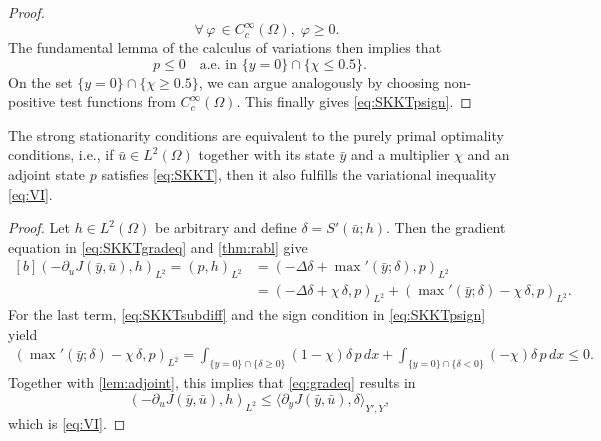 \documentclass[reqno]{shinyart}
\begin{document}
\begin{proof}
\begin{equation*}
        \quad \forall\, \varphi\, \in C_c^\infty(\Omega), \; \varphi \geq 0.
    \end{equation*}
    The fundamental lemma of the calculus of variations then implies that
    \begin{equation*}
        p\leq 0 
        \quad \text{a.e.\ in } \{y = 0\} \cap \{\chi \leq 0.5\}.
    \end{equation*}
    On the set $\{y=0\}\cap \{\chi \geq 0.5\}$, we can argue analogously by choosing non-positive test functions from $C_c^\infty(\Omega)$. 
    This finally gives \eqref{eq:SKKTpsign}.
\end{proof}

\begin{proposition}\label{prop:equiv}
    The strong stationarity conditions are equivalent to the purely primal 
    optimality conditions, i.e., if $\bar{u}\in L^2(\Omega)$ together with its state 
    $\bar{y}$ and a multiplier $\chi$ and an adjoint state $p$ satisfies \eqref{eq:SKKT}, then 
    it also fulfills the variational inequality \eqref{eq:VI}.
\end{proposition}

\begin{proof}
    Let $h \in L^2(\Omega)$ be arbitrary and define $\delta = S'(\bar{u};h)$. Then 
    the gradient equation in \eqref{eq:SKKTgradeq} and \cref{thm:rabl} give 
    \begin{equation}\label{eq:gradeq}
        \begin{aligned}[b]
            (- \partial_u J(\bar{y}, \bar{u}), h)_{L^2} 
            = (p, h)_{L^2} 
            & = (-\Delta \delta+ {\max\nolimits}'(\bar{y}; \delta), p )_{L^2} \\
            & = (-\Delta \delta + \chi\,\delta , p)_{L^2} 
            + ({\max\nolimits}'(\bar{y}; \delta) - \chi\,\delta, p )_{L^2}.
        \end{aligned}
    \end{equation}
    For the last term, \eqref{eq:SKKTsubdiff} and the sign condition in \eqref{eq:SKKTpsign} yield
    \begin{equation*}
        \begin{aligned}
            ({\max\nolimits}'(\bar{y}; \delta) - \chi\,\delta, p )_{L^2}
            =\int_{\{y=0\}\cap\{\delta \geq 0\}} (1 - \chi) \delta \,p \, dx
            + \int_{\{y=0\}\cap\{\delta < 0\}} (- \chi) \delta \,p \, dx \leq 0.
        \end{aligned}
    \end{equation*}
    Together with \cref{lem:adjoint}, this implies that \eqref{eq:gradeq} results in
    \begin{equation*}
        (- \partial_u J(\bar{y}, \bar{u}), h)_{L^2} 
        \leq {\langle {\partial_y J(\bar{y}, \bar{u})} , {\delta} \rangle}_{Y', Y},
    \end{equation*}
    which is \eqref{eq:VI}.
\end{proof}
\end{document}
